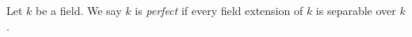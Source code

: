 \begin{definition}
\label{definition-perfect}
Let $k$ be a field. We say $k$ is {\it perfect}
if every field extension of $k$ is separable over $k$.
\end{definition}